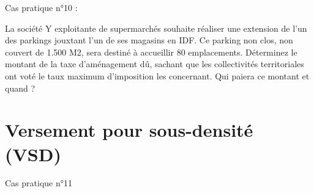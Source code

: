 Cas pratique n°10 :

La société Y exploitante de supermarchés souhaite réaliser une extension de l’un des parkings jouxtant l’un de ses magasins en IDF. Ce parking non clos, non couvert de 1.500 M2, sera destiné à accueillir 80 emplacements.
Déterminez le montant de la taxe d’aménagement dû, sachant que les collectivités territoriales ont voté le taux maximum d’imposition les concernant.
Qui paiera ce montant et quand ?


\section{Versement pour sous-densité (VSD)}


Cas pratique n°11
